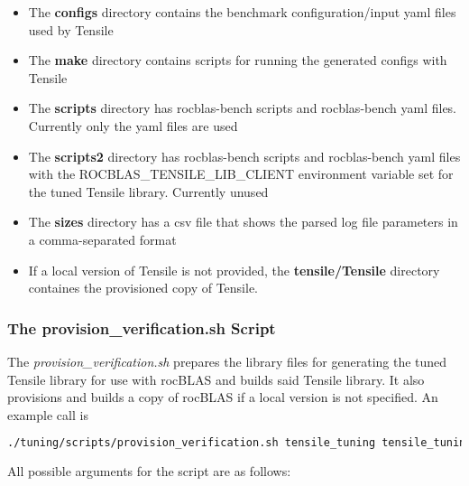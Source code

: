 \documentclass[]{article}
\begin{document}
\begin{itemize}


 \item The \textbf{configs} directory contains the benchmark configuration/input yaml files used by Tensile

 \item The \textbf{make} directory contains scripts for running the generated configs with Tensile

 \item The \textbf{scripts} directory has rocblas-bench scripts and rocblas-bench yaml files. Currently only the yaml files are used

 \item The \textbf{scripts2} directory has rocblas-bench scripts and rocblas-bench yaml files with the ROCBLAS\_TENSILE\_LIB\_CLIENT environment variable set for the tuned Tensile library. Currently unused

 \item The \textbf{sizes} directory has a csv file that shows the parsed log file parameters in a comma-separated format

 \item If a local version of Tensile is not provided, the \textbf{tensile/Tensile} directory containes the provisioned copy of Tensile.

\end{itemize}

\subsubsection{The provision\_verification.sh Script}

The \emph{provision\_verification.sh} prepares the library files for generating the tuned Tensile library for use with rocBLAS and builds said Tensile library. It also provisions and builds a copy of rocBLAS if a local version is not specified. An example call is

\begin{lstlisting}[language=bash,breaklines=true]
./tuning/scripts/provision_verification.sh tensile_tuning tensile_tuning/tensile/Tensile vega20
\end{lstlisting}

\noindent
All possible arguments for the script are as follows:
\end{document}
